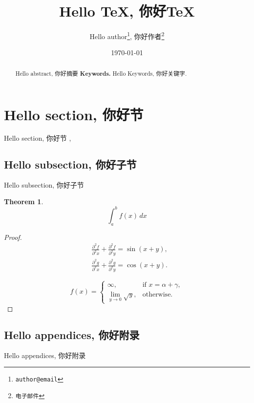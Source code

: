 \documentclass[12pt,a4paper]{article}
\newtheorem{theorem}{Theorem}[section]
\begin{document}
\title{\bf Hello TeX, 你好TeX}
\author{
Hello author\footnote{{\tt author@email}}, 
你好作者\footnote{{\tt 电子邮件}}
}
\date{\today}
\maketitle
\begin{abstract}
Hello abstract, 你好摘要
\vskip0.3cm {\bf Keywords.} Hello Keywords, 你好关键字.
\end{abstract}

\section{Hello section, 你好节}
Hello section, 你好节
\cite{Babuska1989Finite, Brenner2008Mathematical}, 
\cite{2004有限元方法的数学基础}
\subsection{Hello subsection, 你好子节}
Hello subsection, 你好子节
\begin{theorem}
\begin{equation*}
\int_{a}^{b} f(x) \,dx
\end{equation*}
\end{theorem}
\begin{proof}
\begin{align*}
&\frac{\partial^2 f}{\partial^2 x}+\frac{\partial^2 f}{\partial^2 y} = \sin(x+y), \\
&\frac{\partial^2 g}{\partial^2 x}+\frac{\partial^2 g}{\partial^2 y} = \cos(x+y).
\end{align*}

\begin{equation*}
f(x)=\begin{cases}
\infty,  & \mbox{if } x=\alpha+\gamma,  \\
\lim\limits_{y\rightarrow 0}\sqrt{y},  & \mbox{otherwise}.
\end{cases}
\end{equation*}
\end{proof}





\begin{appendices}
\section{Hello appendices, 你好附录}
Hello appendices, 你好附录
\end{appendices}
\end{document}
